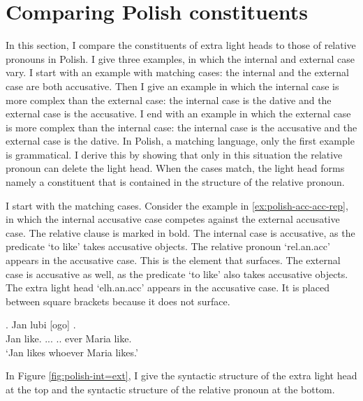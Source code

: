 \section{Comparing Polish constituents}\label{sec:comparing-polish}

In this section, I compare the constituents of extra light heads to those of relative pronouns in Polish. I give three examples, in which the internal and external case vary.
I start with an example with matching cases: the internal and the external case are both accusative.
Then I give an example in which the internal case is more complex than the external case: the internal case is the dative and the external case is the accusative.
I end with an example in which the external case is more complex than the internal case: the internal case is the accusative and the external case is the dative.
In Polish, a matching language, only the first example is grammatical. I derive this by showing that only in this situation the relative pronoun can delete the light head. When the cases match, the light head forms namely a constituent that is contained in the structure of the relative pronoun.

I start with the matching cases.
Consider the example in \ref{ex:polish-acc-acc-rep}, in which the internal accusative case competes against the external accusative case. The relative clause is marked in bold.
The internal case is accusative, as the predicate  `to like' takes accusative objects. The relative pronoun  `\ac{rel}.\ac{an}.\ac{acc}' appears in the accusative case. This is the element that surfaces.
The external case is accusative as well, as the predicate  `to like' also takes accusative objects. The extra light head  `\ac{elh}.\ac{an}.\ac{acc}' appears in the accusative case. It is placed between square brackets because it does not surface.

\exg. Jan lubi [ogo]    .\\
 Jan like.\scsub{[acc]} ...  .. ever Maria like.\scsub{[acc]}\\
 `Jan likes whoever Maria likes.' \label{ex:polish-acc-acc-rep}

In Figure \ref{fig:polish-int=ext}, I give the syntactic structure of the extra light head at the top and the syntactic structure of the relative pronoun at the bottom.


